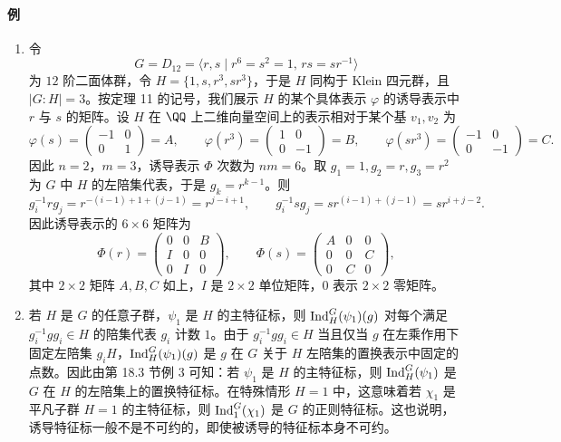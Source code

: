 \paragraph{例}
\begin{enumerate}[label=(\arabic*)]
  \item 令
  \[
    G=D_{12}=\langle r,s\mid r^6=s^2=1,\,rs=sr^{-1}\rangle
  \]
  为 $12$ 阶二面体群，令 $H=\{1,s,r^3,sr^3\}$，于是 $H$ 同构于 Klein 四元群，且 $|G:H|=3$。按定理 11 的记号，我们展示 $H$ 的某个具体表示 $\varphi$ 的诱导表示中 $r$ 与 $s$ 的矩阵。设 $H$ 在 $\QQ$ 上二维向量空间上的表示相对于某个基 $v_1,v_2$ 为
  \[
    \varphi(s)=\begin{pmatrix}-1&0\\0&1\end{pmatrix}=A,
    \qquad
    \varphi(r^3)=\begin{pmatrix}1&0\\0&-1\end{pmatrix}=B,
    \qquad
    \varphi(sr^3)=\begin{pmatrix}-1&0\\0&-1\end{pmatrix}=C.
  \]
  因此 $n=2$，$m=3$，诱导表示 $\Phi$ 次数为 $nm=6$。取 $g_1=1,g_2=r,g_3=r^2$ 为 $G$ 中 $H$ 的左陪集代表，于是 $g_k=r^{k-1}$。则
  \[
    g_i^{-1}rg_j=r^{-(i-1)+1+(j-1)}=r^{j-i+1},
    \qquad
    g_i^{-1}sg_j=sr^{(i-1)+(j-1)}=sr^{i+j-2}.
  \]
  因此诱导表示的 $6\times6$ 矩阵为
  \[
    \Phi(r)=\begin{pmatrix}
    0&0&B\\ I&0&0\\0&I&0
    \end{pmatrix},
    \qquad
    \Phi(s)=\begin{pmatrix}
    A&0&0\\0&0&C\\0&C&0
    \end{pmatrix},
  \]
  其中 $2\times2$ 矩阵 $A,B,C$ 如上，$I$ 是 $2\times2$ 单位矩阵，$0$ 表示 $2\times2$ 零矩阵。

  \item 若 $H$ 是 $G$ 的任意子群，$\psi_1$ 是 $H$ 的主特征标，则 $\operatorname{Ind}_H^G(\psi_1)(g)$ 对每个满足 $g_i^{-1}gg_i\in H$ 的陪集代表 $g_i$ 计数 $1$。由于 $g_i^{-1}gg_i\in H$ 当且仅当 $g$ 在左乘作用下固定左陪集 $g_iH$，$\operatorname{Ind}_H^G(\psi_1)(g)$ 是 $g$ 在 $G$ 关于 $H$ 左陪集的置换表示中固定的点数。因此由第 18.3 节例 3 可知：若 $\psi_1$ 是 $H$ 的主特征标，则 $\operatorname{Ind}_H^G(\psi_1)$ 是 $G$ 在 $H$ 的左陪集上的置换特征标。在特殊情形 $H=1$ 中，这意味着若 $\chi_1$ 是平凡子群 $H=1$ 的主特征标，则 $\operatorname{Ind}_1^G(\chi_1)$ 是 $G$ 的正则特征标。这也说明，诱导特征标一般不是不可约的，即使被诱导的特征标本身不可约。


\end{enumerate}
